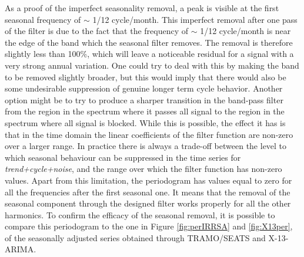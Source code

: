 \documentclass[english,blauw]{cbsdiscussionpaper}
\begin{document}
As a proof of the imperfect seasonality removal, a peak is visible at the first seasonal frequency of $\sim$ 1/12 cycle/month. This imperfect removal after one pass of the filter is due to the fact that the frequency of $\sim$ 1/12 cycle/month is near the edge of the band which the seasonal filter removes. The removal is therefore slightly less than 100\%, which will leave a noticeable residual for a signal with a very strong annual variation. One could try to deal with this by making the band to be removed slightly broader, but this would imply that there would also be some undesirable suppression of genuine longer term cycle behavior. Another option might be to try to produce a sharper transition in the band-pass filter from the region in the spectrum where it passes all signal to the region in the spectrum where all signal is blocked. While this is possible, the effect it has is that in the time domain the linear coefficients of the filter function are non-zero over a larger range. In practice there is always a trade-off between the level to which seasonal behaviour can be suppressed in the time series for \textit{trend+cycle+noise}, and the range over which the filter function has non-zero values. Apart from this limitation, the periodogram has values equal to zero for all the frequencies after the first seasonal one. It means that the removal of the seasonal component through the designed filter works properly for all the other harmonics. To confirm the efficacy of the seasonal removal, it is possible to compare this periodogram to the one in Figure \ref{fig:perIRRSA} and \ref{fig:X13per}, of the seasonally adjusted series obtained through TRAMO/SEATS and X-13-ARIMA.\\
\end{document}
